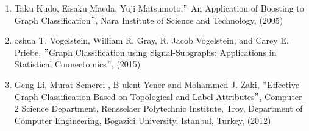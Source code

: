 \documentclass[11pt]{article}
\begin{document}
 \newline
\begin{enumerate}
\item Taku Kudo, Eisaku Maeda, Yuji Matsumoto,$"$ An Application of Boosting to Graph Classification$"$, Nara Institute of Science and Technology, (2005)
\item oshua T. Vogelstein, William R. Gray, R. Jacob Vogelstein, and Carey E. Priebe, $"$Graph Classification using Signal-Subgraphs:
Applications in Statistical Connectomics$"$, (2015)
\item Geng Li, Murat Semerci , B ulent
Yener and Mohammed J. Zaki, $"$Effective Graph Classification Based on Topological and Label Attributes$"$, Computer
2
Science Department, Rensselaer Polytechnic Institute, Troy, Department of Computer Engineering, Bogazici University, Istanbul, Turkey, (2012) 
\end{enumerate}
\end{document}
